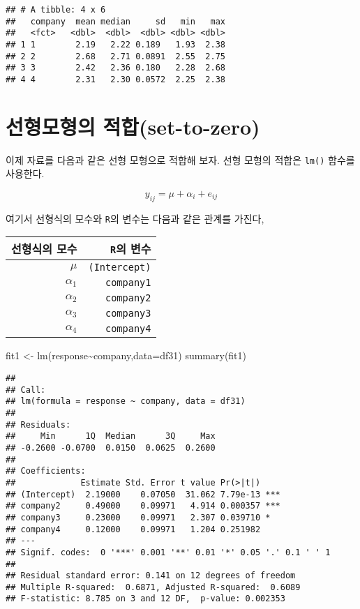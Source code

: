 \documentclass[
]{book}
\newenvironment{Shaded}{\begin{snugshade}}{\end{snugshade}}
\newcommand{\AttributeTok}[1]{\textcolor[rgb]{0.77,0.63,0.00}{#1}}
\newcommand{\FunctionTok}[1]{\textcolor[rgb]{0.00,0.00,0.00}{#1}}
\newcommand{\NormalTok}[1]{#1}
\newcommand{\OtherTok}[1]{\textcolor[rgb]{0.56,0.35,0.01}{#1}}
\newcommand{\SpecialCharTok}[1]{\textcolor[rgb]{0.00,0.00,0.00}{#1}}
\begin{document}
\begin{verbatim}
## # A tibble: 4 x 6
##   company  mean median     sd   min   max
##   <fct>   <dbl>  <dbl>  <dbl> <dbl> <dbl>
## 1 1        2.19   2.22 0.189   1.93  2.38
## 2 2        2.68   2.71 0.0891  2.55  2.75
## 3 3        2.42   2.36 0.180   2.28  2.68
## 4 4        2.31   2.30 0.0572  2.25  2.38
\end{verbatim}

\hypertarget{uxc120uxd615uxbaa8uxd615uxc758-uxc801uxd569set-to-zero}{%
\section{선형모형의 적합(set-to-zero)}\label{uxc120uxd615uxbaa8uxd615uxc758-uxc801uxd569set-to-zero}}

이제 자료를 다음과 같은 선형 모형으로 적합해 보자. 선형 모형의 적합은
\texttt{lm()} 함수를 사용한다.

\[ y_{ij} = \mu + \alpha_i + e_{ij}  \]

여기서 선형식의 모수와 \texttt{R}의 변수는 다음과 같은 관계를 가진다,

\begin{longtable}[]{@{}rr@{}}
\toprule
선형식의 모수 & \texttt{R}의 변수\tabularnewline
\midrule
\endhead
\(\mu\) & \texttt{(Intercept)}\tabularnewline
\(\alpha_1\) & \texttt{company1}\tabularnewline
\(\alpha_2\) & \texttt{company2}\tabularnewline
\(\alpha_3\) & \texttt{company3}\tabularnewline
\(\alpha_4\) & \texttt{company4}\tabularnewline
\bottomrule
\end{longtable}

\begin{Shaded}
\begin{Highlighting}[]
\NormalTok{fit1 }\OtherTok{\textless{}{-}} \FunctionTok{lm}\NormalTok{(response}\SpecialCharTok{\textasciitilde{}}\NormalTok{company,}\AttributeTok{data=}\NormalTok{df31)}
\FunctionTok{summary}\NormalTok{(fit1)}
\end{Highlighting}
\end{Shaded}

\begin{verbatim}
## 
## Call:
## lm(formula = response ~ company, data = df31)
## 
## Residuals:
##     Min      1Q  Median      3Q     Max 
## -0.2600 -0.0700  0.0150  0.0625  0.2600 
## 
## Coefficients:
##             Estimate Std. Error t value Pr(>|t|)    
## (Intercept)  2.19000    0.07050  31.062 7.79e-13 ***
## company2     0.49000    0.09971   4.914 0.000357 ***
## company3     0.23000    0.09971   2.307 0.039710 *  
## company4     0.12000    0.09971   1.204 0.251982    
## ---
## Signif. codes:  0 '***' 0.001 '**' 0.01 '*' 0.05 '.' 0.1 ' ' 1
## 
## Residual standard error: 0.141 on 12 degrees of freedom
## Multiple R-squared:  0.6871, Adjusted R-squared:  0.6089 
## F-statistic: 8.785 on 3 and 12 DF,  p-value: 0.002353
\end{verbatim}
\end{document}
